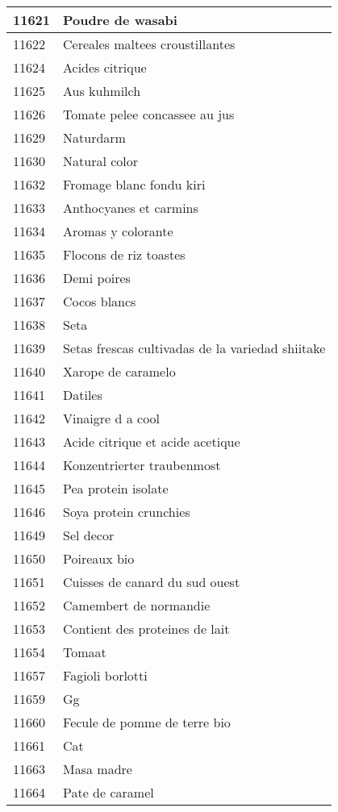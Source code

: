 \begin{longtable}{|l|l|}
11621 & Poudre de wasabi \\ \hline 
11622 & Cereales maltees croustillantes \\ \hline 
11624 & Acides citrique \\ \hline 
11625 & Aus kuhmilch \\ \hline 
11626 & Tomate pelee concassee au jus \\ \hline 
11629 & Naturdarm \\ \hline 
11630 & Natural color \\ \hline 
11632 & Fromage blanc fondu kiri \\ \hline 
11633 & Anthocyanes et carmins \\ \hline 
11634 & Aromas y colorante \\ \hline 
11635 & Flocons de riz toastes \\ \hline 
11636 & Demi poires \\ \hline 
11637 & Cocos blancs \\ \hline 
11638 & Seta \\ \hline 
11639 & Setas frescas cultivadas de la variedad shiitake \\ \hline 
11640 & Xarope de caramelo \\ \hline 
11641 & Datiles \\ \hline 
11642 & Vinaigre d a cool \\ \hline 
11643 & Acide citrique et acide acetique \\ \hline 
11644 & Konzentrierter traubenmost \\ \hline 
11645 & Pea protein isolate \\ \hline 
11646 & Soya protein crunchies \\ \hline 
11649 & Sel decor \\ \hline 
11650 & Poireaux bio \\ \hline 
11651 & Cuisses de canard du sud ouest \\ \hline 
11652 & Camembert de normandie \\ \hline 
11653 & Contient des proteines de lait \\ \hline 
11654 & Tomaat \\ \hline 
11657 & Fagioli borlotti \\ \hline 
11659 & Gg \\ \hline 
11660 & Fecule de pomme de terre bio \\ \hline 
11661 & Cat \\ \hline 
11663 & Masa madre \\ \hline 
11664 & Pate de caramel \\ \hline 

\end{longtable}
